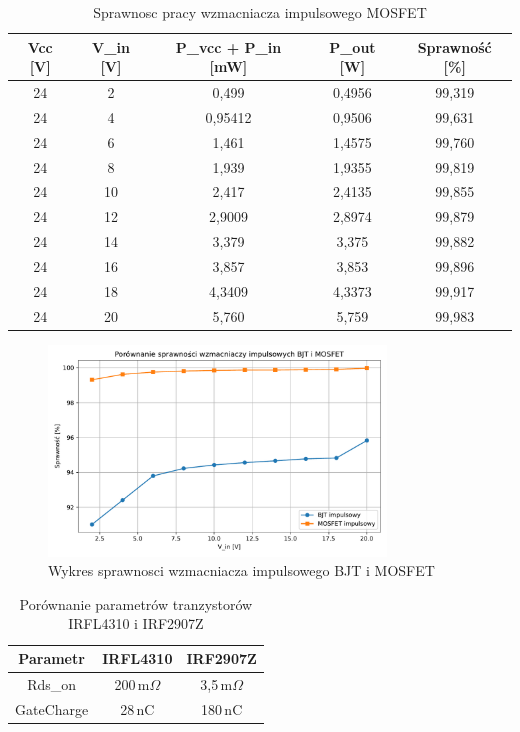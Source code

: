 \documentclass[11pt]{article}
\begin{document}
\begin{table}[H]
\centering
\begin{tabular}{|c|c|c|c|c|}
\hline
\textbf{Vcc [V]} & \textbf{V\_in [V]} & \textbf{P\_vcc + P\_in [mW]} & \textbf{P\_out [W]} & \textbf{Sprawność [\%]} \\
\hline
24 & 2  & 0{,}499    & 0{,}4956   & 99{,}319 \\
\hline
24 & 4  & 0{,}95412  & 0{,}9506   & 99{,}631 \\
\hline
24 & 6  & 1{,}461    & 1{,}4575   & 99{,}760 \\
\hline
24 & 8  & 1{,}939    & 1{,}9355   & 99{,}819 \\
\hline
24 & 10 & 2{,}417    & 2{,}4135   & 99{,}855 \\
\hline
24 & 12 & 2{,}9009   & 2{,}8974   & 99{,}879 \\
\hline
24 & 14 & 3{,}379    & 3{,}375    & 99{,}882 \\
\hline
24 & 16 & 3{,}857    & 3{,}853    & 99{,}896 \\
\hline
24 & 18 & 4{,}3409   & 4{,}3373   & 99{,}917 \\
\hline
24 & 20 & 5{,}760    & 5{,}759    & 99{,}983 \\
\hline
\end{tabular}
\caption{Sprawnosc pracy wzmacniacza impulsowego MOSFET}
\end{table}

\begin{figure}[H]
\centering
\includegraphics[width=0.8\textwidth]{aun1_imp_bjt_vs_mosfet.pdf}
\caption{Wykres sprawnosci wzmacniacza impulsowego BJT i MOSFET}
\end{figure}

\begin{table}[H]
\centering
\begin{tabular}{|c|c|c|}
\hline
\textbf{Parametr} & \textbf{IRFL4310} & \textbf{IRF2907Z} \\
\hline
Rds\_on & 200\,m\(\Omega\) & 3,5\,m\(\Omega\) \\
\hline
GateCharge & 28\,nC & 180\,nC \\
\hline
\end{tabular}

\caption{Porównanie parametrów tranzystorów IRFL4310 i IRF2907Z}
\end{table}
\end{document}
